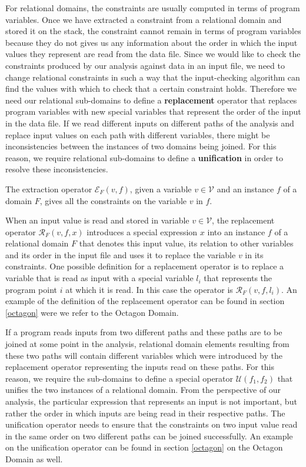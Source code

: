 \documentclass[10pt]{report}
\begin{document}
For relational domains, the constraints are usually computed in terms of program variables. Once we have extracted a constraint from a relational domain and stored it on the stack, the constraint cannot remain in terms of program variables because they do not gives us any information about the order in which the input values they represent are read from the data file. Since we would like to check the constraints produced by our analysis against data in an input file, we need to change relational constraints in such a way that the input-checking algorithm can find the values with which to check that a certain constraint holds. Therefore we need our relational sub-domains to define a \textbf{replacement} operator that replaces program variables with new special variables that represent the order of the input in the data file. If we read different inputs on different paths of the analysis and replace input values on each path with different variables, there might be inconsistencies between the instances of two domains being joined. For this reason, we require relational sub-domains to define a \textbf{unification} in order to resolve these inconsistencies. 

The extraction operator $ \mathcal{E}_{F}(v, f)$, given a variable $ v \in \mathcal{V}$ and an instance $ f $ of a domain $ F $, gives all the constraints on the variable $ v $ in $ f $.
 
 When an input value is read and stored in variable $ v \in \mathcal{V} $, the replacement operator $ \mathcal{R}_{F}(v, f, x) $ introduces a special expression $ x $ into an instance $ f $ of a relational domain $ F $ that denotes this input value, its relation to other variables and its order in the input file and uses it to replace the variable $ v $ in its constraints. One possible definition for a replacement operator is to replace a variable that is read as input with a special variable $ l_{i} $ that represents the program point $ i $ at which it is read. In this case the operator is $ \mathcal{R}_{F}(v, f, l_{i}) $. An example of the definition of the replacement operator can be found in section \ref{octagon} were we refer to the Octagon Domain.  

 
If a program reads inputs from two different paths and these paths are to be joined at some point in the analysis, relational domain elements resulting from these two paths will contain different variables which were introduced by the replacement operator representing the inputs read on these paths. For this reason, we require the sub-domains to define a special operator $ \mathcal{U}(f_{1}, f_{2}) $ that unifies the two instances of a relational domain. From the perspective of our analysis, the particular expression that represents an input is not important, but rather the order in which inputs are being read in their respective paths. The unification operator needs to ensure that the constraints on two input value read in the same order on two different paths can be joined successfully. An example on the unification operator can be found in section \ref{octagon} on the Octagon Domain as well.
\end{document}
